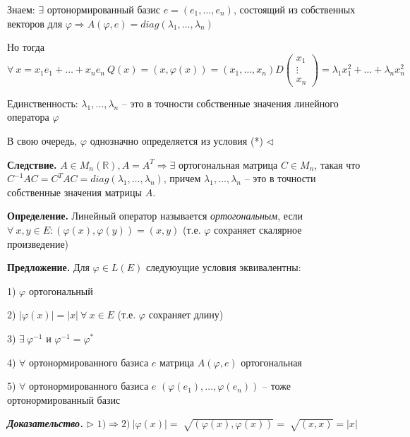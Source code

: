 \vspace{\baselineskip}
Знаем: $\exists$ ортонормированный базис $e= (e_1, \dots, e_n)$, состоящий из собственных векторов для $\varphi \Rightarrow A(\varphi, e) = diag (\lambda_1, \dots, \lambda_n)$

Но тогда $\forall \ x = x_1 e_1 + \dots + x_n e_n \ Q(x) = (x, \varphi(x)) = (x_1, \dots, x_n) D \begin{pmatrix}
x_1 \\ \vdots \\ x_n \end{pmatrix} = \lambda_1 x_1^2 + \dots + \lambda_n x_n^2$

\vspace{\baselineskip}
Единственность: $\lambda_1, \dots, \lambda_n$ -- это в точности собственные значения линейного оператора $\varphi$

В свою очередь, $\varphi$ однозначно определяется из условия (*) $\lhd$

\vspace{\baselineskip}
\textbf{Следствие.} $A \in M_n(\mathbb{R}), A = A^T \Rightarrow \exists$ ортогональная матрица $C \in M_n$, такая что $C^{-1} A C = C^T A C = diag(\lambda_1, \dots, \lambda_n)$, причем $\lambda_1, \dots, \lambda_n$ -- это в точности собственные значения матрицы $A$.

\vspace{\baselineskip}
\textbf{Определение.} Линейный оператор называется \textit{ортогональным}, если $\forall \ x, y \in E: (\varphi(x), \varphi(y)) = (x, y)$ (т.е. $\varphi$ сохраняет скалярное произведение)

\vspace{\baselineskip}
\textbf{Предложение.} Для $\varphi \in L(E)$ следуюущие условия эквивалентны:

1) $\varphi$ ортогональный

2) $|\varphi(x)| = |x| \ \forall \ x \in E$ (т.е. $\varphi$ сохраняет длину)

3) $\exists \ \varphi^{-1}$ и $\varphi^{-1} = \varphi^*$

4) $\forall$ ортонормированного базиса $e$ матрица $A(\varphi, e)$ ортогональная

5) $\forall$ ортонормированного базиса $e$ $(\varphi(e_1), \dots, \varphi(e_n))$ -- тоже ортонормированный базис

\vspace{\baselineskip}
\textbf{\textit{Доказательство.}} $\rhd$ $1) \Rightarrow 2) \ |\varphi(x)| = \sqrt[]{(\varphi(x), \varphi(x))} = \sqrt[]{(x, x)} = |x|$

